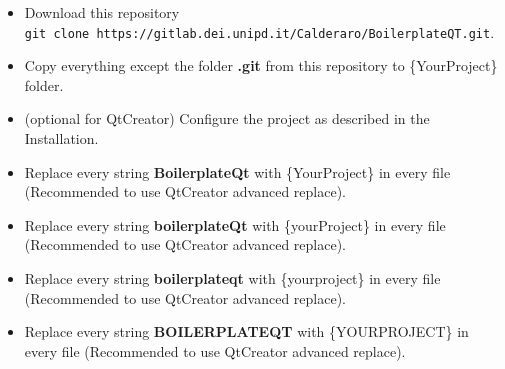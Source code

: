 \begin{itemize}
      \item
            Download this repository
            \texttt{git\ clone\ https://gitlab.dei.unipd.it/Calderaro/BoilerplateQT.git}.
\end{itemize}

\begin{itemize}
      \item
            Copy everything except the folder \textbf{.git} from this repository
            to \{YourProject\} folder.
\end{itemize}

\begin{itemize}
      \item
            (optional for QtCreator) Configure the project as described in the
            Installation.
\end{itemize}

\begin{itemize}
      \item
            Replace every string \textbf{BoilerplateQt} with \{YourProject\} in
            every file (Recommended to use QtCreator advanced replace).
\end{itemize}

\begin{itemize}
      \item
            Replace every string \textbf{boilerplateQt} with \{yourProject\} in
            every file (Recommended to use QtCreator advanced replace).
\end{itemize}

\begin{itemize}
      \item
            Replace every string \textbf{boilerplateqt} with \{yourproject\} in
            every file (Recommended to use QtCreator advanced replace).
\end{itemize}

\begin{itemize}
      \item
            Replace every string \textbf{BOILERPLATEQT} with \{YOURPROJECT\} in
            every file (Recommended to use QtCreator advanced replace).
\end{itemize}

